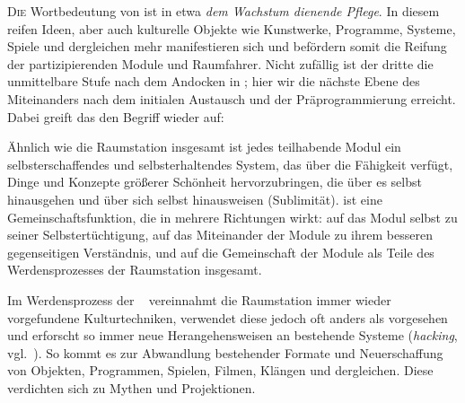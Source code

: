    
\begin{newstuff}
    \lettrine{D}{ie} Wortbedeutung von  ist in etwa \emph{dem Wachstum dienende Pflege}. In diesem  reifen Ideen, aber auch kulturelle Objekte wie Kunstwerke, Programme, Systeme, Spiele und dergleichen mehr manifestieren sich und befördern somit die Reifung der partizipierenden Module und Raumfahrer. Nicht zufällig ist der dritte  die unmittelbare Stufe nach dem Andocken in ; hier wir die nächste Ebene des Miteinanders nach dem initialen Austausch und der Präprogrammierung erreicht. Dabei greift das  den Begriff  wieder auf:


    Ähnlich wie die Raumstation insgesamt ist jedes teilhabende Modul ein selbst\-er\-schaf\-fendes und selbsterhaltendes System, das über die Fähigkeit verfügt, Dinge und Konzepte größerer Schönheit hervorzubringen, die über es selbst hinausgehen und über sich selbst hinausweisen (Sublimität).  ist eine Gemeinschaftsfunktion, die in mehrere Richtungen wirkt: auf das Modul selbst zu seiner Selbstertüchtigung, auf das Miteinander der Module zu ihrem besseren gegenseitigen Verständnis, und auf die Gemeinschaft der Module als Teile des Werdensprozesses der Raumstation insgesamt.

    Im Werdensprozess der \  vereinnahmt die Raumstation immer wieder vorgefundene Kulturtechniken, verwendet diese jedoch oft anders als vorgesehen und erforscht so immer neue Herangehensweisen an bestehende Systeme (\emph{hacking}, vgl.~\cite{levyhackers}). So kommt es zur Abwandlung bestehender Formate und Neuerschaffung von Objekten, Programmen, Spielen, Filmen,  Klängen und dergleichen. Diese verdichten sich zu Mythen und Projektionen.


        

\end{newstuff}
